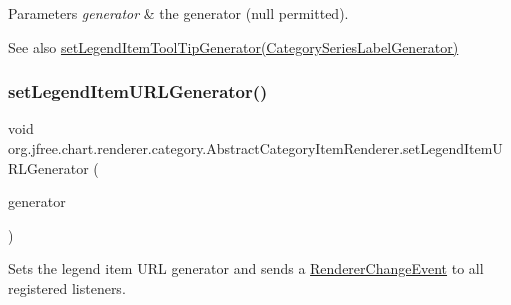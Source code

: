\begin{DoxyParams}{Parameters}
{\em generator} & the generator ({\ttfamily null} permitted).\\
\hline
\end{DoxyParams}
\begin{DoxySeeAlso}{See also}
\mbox{\hyperlink{classorg_1_1jfree_1_1chart_1_1renderer_1_1category_1_1_abstract_category_item_renderer_aea6efd422135015d90c2ced64c82090d}{set\+Legend\+Item\+Tool\+Tip\+Generator(\+Category\+Series\+Label\+Generator)}} 
\end{DoxySeeAlso}
\mbox{\label{classorg_1_1jfree_1_1chart_1_1renderer_1_1category_1_1_abstract_category_item_renderer_a27aede0810b3802871923f1b20c59604}} 
\subsubsection{\texorpdfstring{set\+Legend\+Item\+U\+R\+L\+Generator()}{setLegendItemURLGenerator()}}
{\footnotesize\ttfamily void org.\+jfree.\+chart.\+renderer.\+category.\+Abstract\+Category\+Item\+Renderer.\+set\+Legend\+Item\+U\+R\+L\+Generator (\begin{DoxyParamCaption}\item[{\mbox{\hyperlink{interfaceorg_1_1jfree_1_1chart_1_1labels_1_1_category_series_label_generator}{Category\+Series\+Label\+Generator}}}]{generator }\end{DoxyParamCaption})}

Sets the legend item U\+RL generator and sends a \mbox{\hyperlink{}{Renderer\+Change\+Event}} to all registered listeners.


